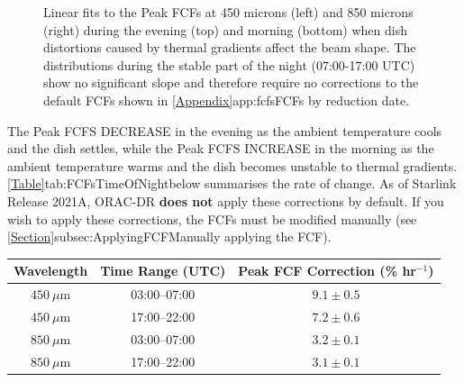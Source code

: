 \begin{figure}
\begin{center}
\caption[FCFs Time of Night Fits]{Linear fits to the Peak FCFs at 450 microns (left) and 850 microns (right)
 during the evening (top) and morning (bottom) when dish distortions caused by thermal gradients affect the 
 beam shape. The distributions during the stable part of the night (07:00-17:00 UTC) show no significant 
 slope and therefore require no corrections to the default FCFs shown in
 \cref{Appendix}{app:fcfs}{FCFs by reduction date}. \label{fig:FCFsTimeOfNightFits}}
\end{center}
\end{figure}


The Peak FCFS DECREASE in the evening as the ambient temperature cools and the dish settles, while
the Peak FCFS INCREASE in the morning as the ambient temperature warms and the dish becomes
unstable to thermal gradients. \cref{Table}{tab:FCFsTimeOfNight}{below} summarises the rate of change.
As of Starlink Release 2021A, ORAC-DR \textbf{does not} apply these corrections by default. If
you wish to apply these corrections, the FCFs must be modified manually (see
\cref{Section}{subsec:ApplyingFCF}{Manually applying the FCF}).


\begin{table}[h!]
\begin{center}
\begin{tabular}{|c|c|c|}
 \hline
 \multicolumn{1}{|c|}{Wavelength} &
 \multicolumn{1}{c|}{Time Range (UTC)} &
 \multicolumn{1}{c|}{Peak FCF Correction (\% hr$^{-1}$)}
 \\ \hline
$450~\mu$m & 03:00--07:00 & $9.1\pm0.5$ \\
$450~\mu$m & 17:00--22:00 & $7.2\pm0.6$ \\
\hline
$850~\mu$m & 03:00--07:00 & $3.2\pm0.1$ \\
$850~\mu$m & 17:00--22:00 & $3.1\pm0.1$ \\ \hline
\end{tabular}
\end{center}
\label{tab:FCFsTimeOfNight}
\end{table}

